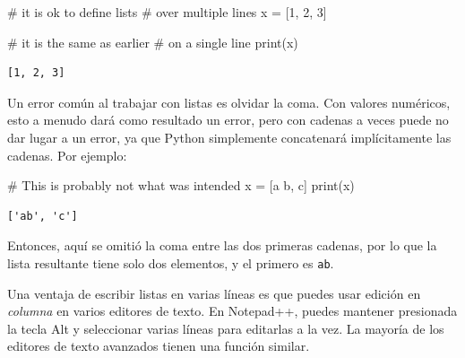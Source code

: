 \documentclass[
  letterpaper,
]{scrbook}
\newenvironment{Shaded}{\begin{snugshade}}{\end{snugshade}}
\newcommand{\BuiltInTok}[1]{\textcolor[rgb]{0.00,0.23,0.31}{#1}}
\newcommand{\CommentTok}[1]{\textcolor[rgb]{0.37,0.37,0.37}{#1}}
\newcommand{\DecValTok}[1]{\textcolor[rgb]{0.68,0.00,0.00}{#1}}
\newcommand{\NormalTok}[1]{\textcolor[rgb]{0.00,0.23,0.31}{#1}}
\newcommand{\OperatorTok}[1]{\textcolor[rgb]{0.37,0.37,0.37}{#1}}
\newcommand{\StringTok}[1]{\textcolor[rgb]{0.13,0.47,0.30}{#1}}
\begin{document}
\begin{Shaded}
\begin{Highlighting}[]
\CommentTok{\# it is ok to define lists}
\CommentTok{\# over multiple lines}
\NormalTok{x }\OperatorTok{=}\NormalTok{ [}\DecValTok{1}\NormalTok{,}
     \DecValTok{2}\NormalTok{,}
     \DecValTok{3}\NormalTok{]}

\CommentTok{\# it is the same as earlier}
\CommentTok{\# on a single line}
\BuiltInTok{print}\NormalTok{(x)}
\end{Highlighting}
\end{Shaded}

\begin{verbatim}
[1, 2, 3]
\end{verbatim}

Un error común al trabajar con listas es olvidar la coma. Con valores
numéricos, esto a menudo dará como resultado un error, pero con cadenas
a veces puede no dar lugar a un error, ya que Python simplemente
concatenará implícitamente las cadenas. Por ejemplo:

\begin{Shaded}
\begin{Highlighting}[]
\CommentTok{\# This is probably not what was intended}
\NormalTok{x }\OperatorTok{=}\NormalTok{ [}\StringTok{\textquotesingle{}a\textquotesingle{}} \StringTok{\textquotesingle{}b\textquotesingle{}}\NormalTok{, }\StringTok{\textquotesingle{}c\textquotesingle{}}\NormalTok{]}
\BuiltInTok{print}\NormalTok{(x)}
\end{Highlighting}
\end{Shaded}

\begin{verbatim}
['ab', 'c']
\end{verbatim}

Entonces, aquí se omitió la coma entre las dos primeras cadenas, por lo
que la lista resultante tiene solo dos elementos, y el primero es
\texttt{\textquotesingle{}ab\textquotesingle{}}.

\begin{tcolorbox}[enhanced jigsaw, colbacktitle=quarto-callout-note-color!10!white, arc=.35mm, opacityback=0, colframe=quarto-callout-note-color-frame, colback=white, left=2mm, leftrule=.75mm, title={Note}, bottomtitle=1mm, rightrule=.15mm, toptitle=1mm, coltitle=black, titlerule=0mm, toprule=.15mm, bottomrule=.15mm, opacitybacktitle=0.6, breakable]

Una ventaja de escribir listas en varias líneas es que puedes usar
edición en \emph{columna} en varios editores de texto. En Notepad++,
puedes mantener presionada la tecla Alt y seleccionar varias líneas para
editarlas a la vez. La mayoría de los editores de texto avanzados tienen
una función similar.

\end{tcolorbox}
\end{document}
